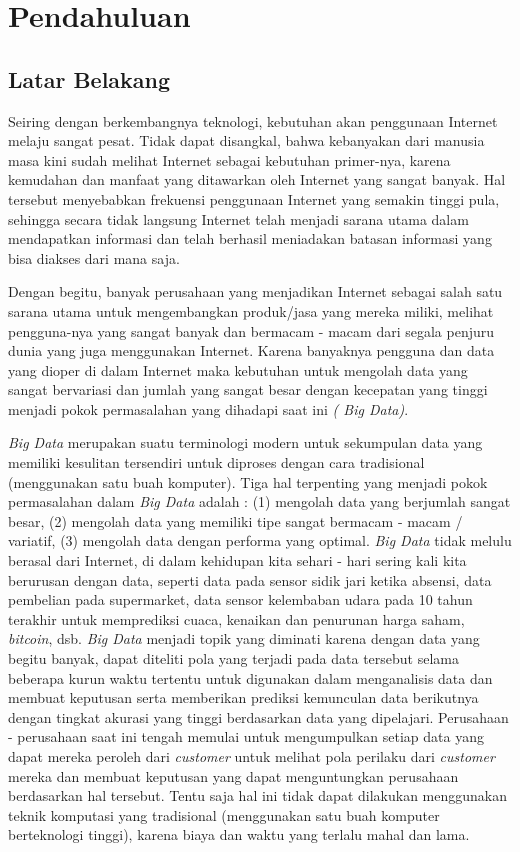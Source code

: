 \chapter{Pendahuluan}

\section{Latar Belakang}
Seiring dengan berkembangnya teknologi, kebutuhan akan penggunaan Internet melaju sangat pesat. Tidak dapat disangkal, bahwa kebanyakan dari manusia masa kini sudah melihat Internet sebagai kebutuhan primer-nya, karena kemudahan dan manfaat yang ditawarkan oleh Internet yang sangat banyak. Hal tersebut menyebabkan frekuensi penggunaan Internet yang semakin tinggi pula, sehingga secara tidak langsung Internet telah menjadi sarana utama dalam mendapatkan informasi dan telah berhasil meniadakan batasan informasi yang bisa diakses dari mana saja.

Dengan begitu, banyak perusahaan yang menjadikan Internet sebagai salah satu sarana utama untuk mengembangkan produk/jasa yang mereka miliki, melihat pengguna-nya yang sangat banyak dan bermacam - macam dari segala penjuru dunia yang juga menggunakan Internet. Karena banyaknya pengguna dan data yang dioper di dalam Internet maka kebutuhan untuk mengolah data yang sangat bervariasi dan jumlah yang sangat besar dengan kecepatan yang tinggi menjadi pokok permasalahan yang dihadapi saat ini \textit{( Big Data)}.

{\it Big Data} merupakan suatu terminologi modern untuk sekumpulan data yang memiliki kesulitan tersendiri untuk diproses dengan cara tradisional (menggunakan satu buah komputer).
Tiga hal terpenting yang menjadi pokok permasalahan dalam {\it Big Data} adalah : (1) mengolah data yang berjumlah sangat besar, (2) mengolah data yang memiliki tipe sangat bermacam - macam / variatif, (3) mengolah data dengan performa yang optimal. {\it Big Data} tidak melulu berasal dari Internet, di dalam kehidupan kita sehari - hari sering kali kita berurusan dengan data, seperti data pada sensor sidik jari ketika absensi, data pembelian pada supermarket, data sensor kelembaban udara pada 10 tahun terakhir untuk memprediksi cuaca, kenaikan dan penurunan harga saham, {\it bitcoin}, dsb. {\it Big Data} menjadi topik yang diminati karena dengan data yang begitu banyak, dapat diteliti pola yang terjadi pada data tersebut selama beberapa kurun waktu tertentu untuk digunakan dalam menganalisis data dan membuat keputusan serta memberikan prediksi kemunculan data berikutnya dengan tingkat akurasi yang tinggi berdasarkan data yang dipelajari. Perusahaan - perusahaan saat ini tengah memulai untuk mengumpulkan setiap data yang dapat mereka peroleh dari {\it customer} untuk melihat pola perilaku dari {\it customer} mereka dan membuat keputusan yang dapat menguntungkan perusahaan berdasarkan hal tersebut. Tentu saja hal ini tidak dapat dilakukan menggunakan teknik komputasi yang tradisional (menggunakan satu buah komputer berteknologi tinggi), karena biaya dan waktu yang terlalu mahal dan lama.

